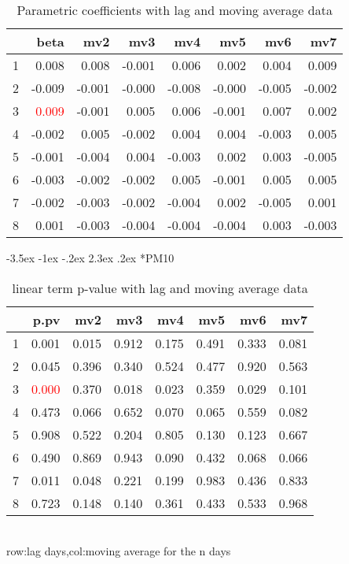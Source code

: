 \documentclass[a4paper, 12pt]{article}
\makeatletter
\def\large{\fontsize{14}{20}\selectfont}
\renewcommand\subsection{\@startsection {subsection}{1}{\z@}%
                                   {-3.5ex \@plus -1ex \@minus -.2ex}%
                                   {2.3ex \@plus.2ex}%
                                   {\centering\normalfont\large\bfseries}}
\makeatother
\begin{document}
\begin{table}[h]
\centering
\caption{Parametric coefficients with lag and moving average data}
\begin{tabular}{rrrrrrrr}
  \hline
 & beta & mv2 & mv3 & mv4 & mv5 & mv6 & mv7 \\
  \hline
1 & 0.008 & 0.008 & -0.001 & 0.006 & 0.002 & 0.004 & 0.009 \\
  2 & -0.009 & -0.001 & -0.000 & -0.008 & -0.000 & -0.005 & -0.002 \\
  3 & \textcolor{red}{0.009} & -0.001 & 0.005 & 0.006 & -0.001 & 0.007 & 0.002 \\
  4 & -0.002 & 0.005 & -0.002 & 0.004 & 0.004 & -0.003 & 0.005 \\
  5 & -0.001 & -0.004 & 0.004 & -0.003 & 0.002 & 0.003 & -0.005 \\
  6 & -0.003 & -0.002 & -0.002 & 0.005 & -0.001 & 0.005 & 0.005 \\
  7 & -0.002 & -0.003 & -0.002 & -0.004 & 0.002 & -0.005 & 0.001 \\
  8 & 0.001 & -0.003 & -0.004 & -0.004 & -0.004 & 0.003 & -0.003 \\
   \hline
\end{tabular}
\end{table}
\clearpage
\subsection*{PM10}
\begin{table}[h]
\centering
\caption{linear term p-value with lag and moving average data}
\begin{tabular}{rrrrrrrr}
  \hline
 & p.pv & mv2 & mv3 & mv4 & mv5 & mv6 & mv7 \\
  \hline
1 & 0.001 & 0.015 & 0.912 & 0.175 & 0.491 & 0.333 & 0.081 \\
  2 & 0.045 & 0.396 & 0.340 & 0.524 & 0.477 & 0.920 & 0.563 \\
  3 & \textcolor{red}{0.000} & 0.370 & 0.018 & 0.023 & 0.359 & 0.029 & 0.101 \\
  4 & 0.473 & 0.066 & 0.652 & 0.070 & 0.065 & 0.559 & 0.082 \\
  5 & 0.908 & 0.522 & 0.204 & 0.805 & 0.130 & 0.123 & 0.667 \\
  6 & 0.490 & 0.869 & 0.943 & 0.090 & 0.432 & 0.068 & 0.066 \\
  7 & 0.011 & 0.048 & 0.221 & 0.199 & 0.983 & 0.436 & 0.833 \\
  8 & 0.723 & 0.148 & 0.140 & 0.361 & 0.433 & 0.533 & 0.968 \\
   \hline
\end{tabular}
\\row:lag days,col:moving average for the n days
\end{table}
\end{document}
